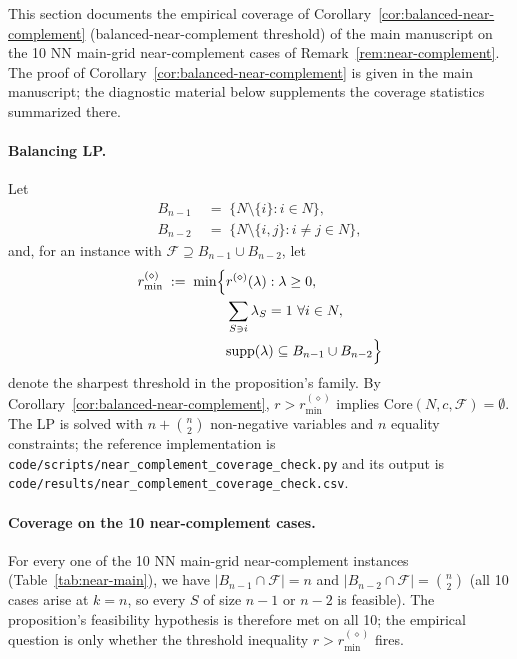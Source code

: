 \documentclass[11pt]{article}
\theoremstyle{plain}
\theoremstyle{definition}
\theoremstyle{remark}
\begin{document}
This section documents the empirical coverage of Corollary~\ref{cor:balanced-near-complement} (balanced-near-complement threshold) of the main manuscript on the 10 NN main-grid near-complement cases of Remark~\ref{rem:near-complement}. The proof of Corollary~\ref{cor:balanced-near-complement} is given in the main manuscript; the diagnostic material below supplements the coverage statistics summarized there.

\paragraph{Balancing LP.} Let
\[
\begin{aligned}
  B_{n-1} & \;=\;\{N\setminus\{i\}: i\in N\}, \\
  B_{n-2} & \;=\;\{N\setminus\{i,j\}: i\neq j\in N\},
\end{aligned}
\]
and, for an instance with $\mathcal{F}\supseteq B_{n-1}\cup B_{n-2}$, let
\[
\begin{aligned}
  r^{(\diamond)}_{\min}\;:=\;\min\Bigl\{ {} & r^{(\diamond)}(\lambda) : \lambda\ge 0, \\
  & \sum_{S\ni i}\lambda_S=1\ \forall i\in N, \\
  & \mathrm{supp}(\lambda)\subseteq B_{n-1}\cup B_{n-2}\Bigr\}
\end{aligned}
\]
denote the sharpest threshold in the proposition's family. By Corollary~\ref{cor:balanced-near-complement}, $r>r^{(\diamond)}_{\min}$ implies $\mathrm{Core}(N,c,\mathcal{F})=\emptyset$. The LP is solved with $n+\binom{n}{2}$ non-negative variables and $n$ equality constraints; the reference implementation is \verb|code/scripts/near_complement_coverage_check.py| and its output is \verb|code/results/near_complement_coverage_check.csv|.

\paragraph{Coverage on the 10 near-complement cases.} For every one of the 10 NN main-grid near-complement instances (Table~\ref{tab:near-main}), we have $|B_{n-1}\cap\mathcal{F}|=n$ and $|B_{n-2}\cap\mathcal{F}|=\binom{n}{2}$ (all 10 cases arise at $k=n$, so every $S$ of size $n-1$ or $n-2$ is feasible). The proposition's feasibility hypothesis is therefore met on all 10; the empirical question is only whether the threshold inequality $r>r^{(\diamond)}_{\min}$ fires.
\end{document}
